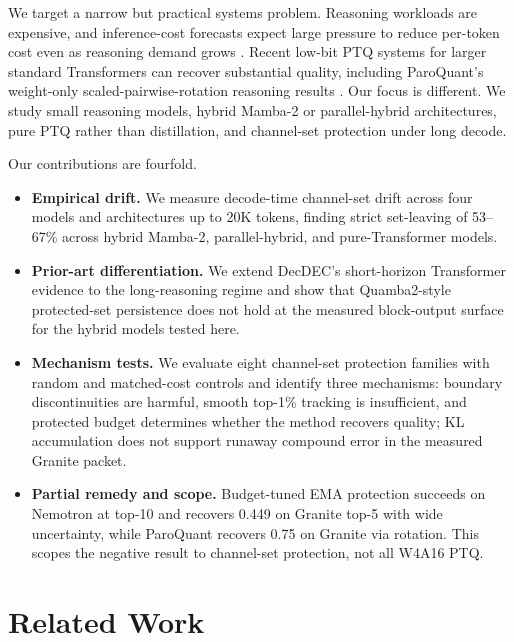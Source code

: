 \documentclass{article}
\begin{document}
We target a narrow but practical systems problem. Reasoning workloads are expensive, and inference-cost forecasts expect large pressure to reduce per-token cost even as reasoning demand grows \citep{wiggers2025reasoningcosts,gartner2026inferencecost}. Recent low-bit PTQ systems for larger standard Transformers can recover substantial quality, including ParoQuant's weight-only scaled-pairwise-rotation reasoning results \citep{liang2026paroquant}. Our focus is different. We study small reasoning models, hybrid Mamba-2 or parallel-hybrid architectures, pure PTQ rather than distillation, and channel-set protection under long decode.

Our contributions are fourfold.
\begin{itemize}
\item \textbf{Empirical drift.} We measure decode-time channel-set drift across four models and architectures up to 20K tokens, finding strict set-leaving of 53--67\% across hybrid Mamba-2, parallel-hybrid, and pure-Transformer models.
\item \textbf{Prior-art differentiation.} We extend DecDEC's short-horizon Transformer evidence to the long-reasoning regime and show that Quamba2-style protected-set persistence does not hold at the measured block-output surface for the hybrid models tested here.
\item \textbf{Mechanism tests.} We evaluate eight channel-set protection families with random and matched-cost controls and identify three mechanisms: boundary discontinuities are harmful, smooth top-1\% tracking is insufficient, and protected budget determines whether the method recovers quality; KL accumulation does not support runaway compound error in the measured Granite packet.
\item \textbf{Partial remedy and scope.} Budget-tuned EMA protection succeeds on Nemotron at top-10 and recovers 0.449 on Granite top-5 with wide uncertainty, while ParoQuant recovers 0.75 on Granite via rotation. This scopes the negative result to channel-set protection, not all W4A16 PTQ.
\end{itemize}

\section{Related Work}
\end{document}
